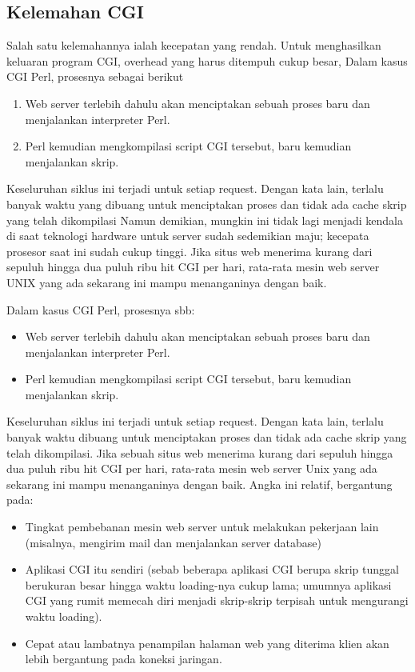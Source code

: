 \begin{enumerate}
\subsection{Kelemahan CGI} 
Salah satu kelemahannya ialah kecepatan yang rendah. Untuk menghasilkan keluaran program CGI, overhead yang harus ditempuh cukup besar, Dalam kasus CGI Perl, prosesnya sebagai berikut 
\begin{enumerate}
	\item Web server terlebih dahulu akan menciptakan sebuah proses baru dan menjalankan interpreter Perl.
	\item Perl kemudian mengkompilasi script CGI tersebut, baru kemudian menjalankan skrip.
\end{enumerate}
Keseluruhan siklus ini terjadi untuk setiap request. Dengan kata lain, terlalu banyak waktu yang dibuang untuk menciptakan proses dan tidak ada cache skrip yang telah dikompilasi
Namun demikian, mungkin ini tidak lagi menjadi kendala di saat teknologi hardware untuk server sudah sedemikian maju; kecepata prosesor saat ini sudah cukup tinggi. Jika situs web menerima kurang dari sepuluh hingga dua puluh ribu hit CGI per hari, rata-rata mesin web server UNIX yang ada sekarang ini mampu menanganinya dengan baik. 

Dalam kasus CGI Perl, prosesnya sbb: 
\begin{itemize}
	\item Web server terlebih dahulu akan menciptakan sebuah proses baru dan menjalankan interpreter Perl.  
	\item Perl kemudian mengkompilasi script CGI tersebut, baru kemudian menjalankan skrip.\end{itemize}
Keseluruhan siklus ini terjadi untuk setiap request. Dengan kata lain, terlalu banyak waktu dibuang untuk menciptakan proses dan tidak ada cache skrip yang telah dikompilasi. 
Jika sebuah situs web menerima kurang dari sepuluh hingga dua puluh ribu hit CGI per hari, rata-rata mesin web server Unix yang ada sekarang ini mampu menanganinya dengan baik. 
Angka ini relatif, bergantung pada:
\begin{itemize}
	\item Tingkat pembebanan mesin web server untuk melakukan pekerjaan lain (misalnya, mengirim mail dan menjalankan server database)
	\item Aplikasi CGI itu sendiri (sebab beberapa aplikasi CGI berupa skrip tunggal berukuran besar hingga waktu loading-nya cukup lama; umumnya aplikasi CGI yang rumit memecah diri menjadi skrip-skrip terpisah untuk mengurangi waktu loading). \par
	\item Cepat atau lambatnya penampilan halaman web yang diterima klien akan lebih bergantung pada koneksi jaringan.\end{itemize}

\end{enumerate}
